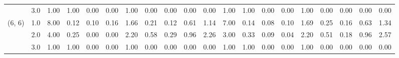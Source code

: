\begin{tabular}{llrrrrrrrrrrrrrrrrrr}
       & 3.0 &               1.00 &                     1.00 &                                 0.00 &                             0.00 &                           1.00 &                                               0.00 &                                            0.00 &                                            0.00 &                                        0.00 &               1.00 &                     1.00 &                                 0.00 &                             0.00 &                           1.00 &                                               0.00 &                                            0.00 &                                            0.00 &                                        0.00 \\
(6, 6) & 1.0 &               8.00 &                     0.12 &                                 0.10 &                             0.16 &                           1.66 &                                               0.21 &                                            0.12 &                                            0.61 &                                        1.14 &               7.00 &                     0.14 &                                 0.08 &                             0.10 &                           1.69 &                                               0.25 &                                            0.16 &                                            0.63 &                                        1.34 \\
       & 2.0 &               4.00 &                     0.25 &                                 0.00 &                             0.00 &                           2.20 &                                               0.58 &                                            0.29 &                                            0.96 &                                        2.26 &               3.00 &                     0.33 &                                 0.09 &                             0.04 &                           2.20 &                                               0.51 &                                            0.18 &                                            0.96 &                                        2.57 \\
       & 3.0 &               1.00 &                     1.00 &                                 0.00 &                             0.00 &                           1.00 &                                               0.00 &                                            0.00 &                                            0.00 &                                        0.00 &               1.00 &                     1.00 &                                 0.00 &                             0.00 &                           1.00 &                                               0.00 &                                            0.00 &                                            0.00 &                                        0.00 \\
\bottomrule
\end{tabular}
